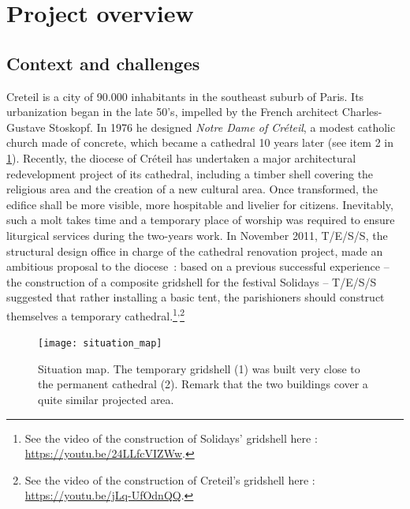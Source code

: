 \section{Project overview}\label{sec=proj_overview}
\subsection{Context and challenges}
Creteil is a city of 90.000 inhabitants in the southeast suburb of Paris. Its urbanization began in the late 50’s, impelled by the French architect Charles-Gustave Stoskopf. In 1976 he designed \emph{Notre Dame of Créteil}, a modest catholic church made of concrete, which became a cathedral 10 years later (see item 2 in \cref{fig:situation_map}). Recently, the diocese of Créteil has undertaken a major architectural redevelopment project of its cathedral, including a timber shell covering the religious area and the creation of a new cultural area. Once transformed, the edifice shall be more visible, more hospitable and livelier for citizens. Inevitably, such a molt takes time and a temporary place of worship was required to ensure liturgical services during the two-years work. In November 2011, T/E/S/S, the structural design office in charge of the cathedral renovation project, made an ambitious proposal to the diocese~: based on a previous successful experience – the construction of a composite gridshell for the festival Solidays \cite{Baverel2012} – T/E/S/S suggested that rather installing a basic tent, the parishioners should construct themselves a temporary cathedral.\footnote{See the video of the construction of Solidays' gridshell here : \url{https://youtu.be/24LLfcVIZWw}.}\textsuperscript{,}\footnote{See the video of the construction of Creteil's gridshell here : \url{https://youtu.be/jLq-UfOdnQQ}.}

\begin{figure}[t]
	\centering
		\texttt{[image: situation\_map]}
		\caption[Situation map]{Situation map. The temporary gridshell (1) was built very close to the permanent cathedral (2). Remark that  the two buildings cover a quite similar projected area.}
		\label{fig:situation_map}    
\end{figure}

